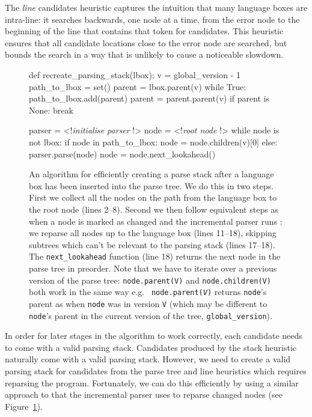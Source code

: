 \documentclass[sigplan,screen]{acmart}\settopmatter{printfolios=true,printccs=false,printacmref=false}
\begin{document}
The \emph{line} candidates heuristic captures the intuition that many language
boxes are intra-line: it searches
backwards, one node at a time, from the error node to the beginning of the line
that contains that token for candidates. This heuristic ensures that all
candidate locations close to the error node are searched, but bounds the search
in a way that is unlikely to cause a noticeable slowdown.

\begin{figure}
\begin{lstdefault}[]
def recreate_parsing_stack(lbox):
  v = global_version - 1
  path_to_lbox = set()
  parent = lbox.parent(v)
  while True:
    path_to_lbox.add(parent)
    parent = parent.parent(v)
    if parent is None:
      break

  parser = <!\textrm{\textit{initialise parser}} !>
  node = <!\textrm{\textit{root node}} !>
  while node is not lbox:
    if node in path_to_lbox:
      node = node.children(v)[0]
    else:
      parser.parse(node)
      node = node.next_lookahead()
\end{lstdefault}
\caption{An algorithm for efficiently creating a parse stack after a language box
has been inserted into the parse tree. We do this in two steps. First we
collect all the nodes on the path from the language box to the root node (lines
2--8). Second we then follow equivalent steps as when a node is marked as
changed and the incremental parser runs \cite[p.~63]{wagner98practicalalgorithms}:
we reparse all nodes up to the language box (lines 11--18), skipping
subtrees which can't be relevant to the parsing stack (lines 17--18). The
\texttt{next\_lookahead} function (line 18) returns the next node in the parse
tree in preorder. Note that we have to iterate over a previous version of the
parse tree: \texttt{node.parent(V)} and \texttt{node.children(V)} both work in
the same way e.g.~ \texttt{node.parent(\textit{V})} returns \texttt{node}'s
parent as when \texttt{node} was in version \texttt{V} (which may be
different to \texttt{node}'s parent in the current version of the tree,
\texttt{global\_version}).}
\label{fig:createparsestack}
\end{figure}

In order for later stages in the algorithm to work correctly, each candidate
needs to come with a valid parsing stack. Candidates produced by the stack
heuristic naturally come with a valid parsing stack. However, we need to create a
valid parsing stack for candidates from the parse tree and line heuristics which
requires reparsing the program. Fortunately, we can do this efficiently by
using a similar approach to that the incremental parser uses to reparse changed
nodes (see Figure~\ref{fig:createparsestack}).
\end{document}
